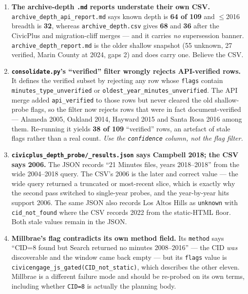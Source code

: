 \documentclass[11pt]{article}
\begin{document}
\begin{enumerate}

\item \textbf{The archive-depth \texttt{.md} reports understate their own CSV.}
\texttt{archive\_depth\_api\_report.md} says known depth is \textbf{64 of 109} and $\leq$2016
breadth is \textbf{32}, whereas \texttt{archive\_depth.csv} gives \textbf{68} and \textbf{36}
after the CivicPlus and migration-cliff merges --- and it carries \emph{no} supersession banner.
\texttt{archive\_depth\_report.md} is the older shallow snapshot (55 unknown, 27 verified, Marin
County at 2024, gaps 2) and does carry one. Believe the CSV.

\item \textbf{\texttt{consolidate.py}'s ``verified'' filter wrongly rejects API-verified rows.} It
defines the verified subset by rejecting any row whose \texttt{flags} contain
\texttt{minutes\_type\_unverified} or \texttt{oldest\_year\_minutes\_unverified}. The API merge
added \texttt{api\_verified} to those rows but never cleared the old shallow-probe flags, so the
filter now rejects rows that were in fact document-verified --- Alameda 2005, Oakland 2014,
Hayward 2015 and Santa Rosa 2016 among them. Re-running it yields \textbf{38 of 109} ``verified''
rows, an artefact of stale flags rather than a real count. \emph{Use the \texttt{confidence}
column, not the flag filter.}

\item \textbf{\texttt{civicplus\_depth\_probe/\_results.json} says Campbell 2018; the CSV says
2006.} The JSON records ``21 Minutes files, years 2018--2018'' from the wide 2004--2018 query.
The CSV's 2006 is the later and correct value --- the wide query returned a truncated or
most-recent slice, which is exactly why the second pass switched to single-year probes, and the
year-by-year hits support 2006. The same JSON also records Los Altos Hills as \texttt{unknown}
with \texttt{cid\_not\_found} where the CSV records 2022 from the static-HTML floor. Both stale
values remain in the JSON.

\item \textbf{Millbrae's flag contradicts its own method field.} Its \texttt{method} says
``CID=8 found but Search returned no minutes 2008--2016'' --- the CID \emph{was} discoverable and
the window came back empty --- but its \texttt{flags} value is
\texttt{civicengage\_js\_gated(CID\_not\_static)}, which describes the other eleven. Millbrae is
a different failure mode and should be re-probed on its own terms, including whether
\texttt{CID=8} is actually the planning body.


\end{enumerate}
\end{document}
